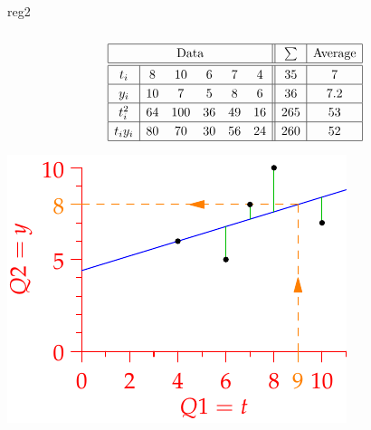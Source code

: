 \begin{example}{}{reg2}
\begin{minipage}[t]{0.6\linewidth}\vspace{-23pt}
\[\def\arraystretch{1.2}
\begin{array}[t]{|c|ccccc||c|c|}\hline
\multicolumn{6}{|c||}{\text{Data}}&\sum&\text{Average}\\\hline\hline
t_i&8&10&6&7&4&35&7\\\hline
y_i&10&7&5&8&6&36&7.2\\\hline
t_i^2&64&100&36&49&16&265&53\\\hline
t_iy_i&80&70&30&56&24&260&52\\\hline
\end{array}\]
\end{minipage}\hfill\begin{minipage}[t]{0.39\linewidth}\vspace{-2pt}
	\flushright\includegraphics{reg-line3}
\end{minipage}\par\vspace{-45pt}


\end{example}
